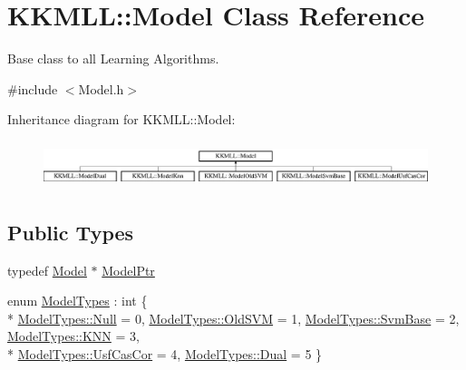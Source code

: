 \hypertarget{class_k_k_m_l_l_1_1_model}{}\section{K\+K\+M\+LL\+:\+:Model Class Reference}
\label{class_k_k_m_l_l_1_1_model}


Base class to all Learning Algorithms.  




{\ttfamily \#include $<$Model.\+h$>$}

Inheritance diagram for K\+K\+M\+LL\+:\+:Model\+:\begin{figure}[H]
\begin{center}
\leavevmode
\includegraphics[height=1.374233cm]{class_k_k_m_l_l_1_1_model}
\end{center}
\end{figure}
\subsection*{Public Types}
\begin{DoxyCompactItemize}
\item 
typedef \hyperlink{class_k_k_m_l_l_1_1_model}{Model} $\ast$ \hyperlink{class_k_k_m_l_l_1_1_model_a9560fa355dc53fa82541f55582a6d6ea}{Model\+Ptr}
\item 
enum \hyperlink{class_k_k_m_l_l_1_1_model_aeda4060e088c67446ca993eefcecea06}{Model\+Types} \+: int \{ \\*
\hyperlink{class_k_k_m_l_l_1_1_model_aeda4060e088c67446ca993eefcecea06abbb93ef26e3c101ff11cdd21cab08a94}{Model\+Types\+::\+Null} = 0, 
\hyperlink{class_k_k_m_l_l_1_1_model_aeda4060e088c67446ca993eefcecea06a7a3ee72cc2709227d58fd2c189a2a58b}{Model\+Types\+::\+Old\+S\+VM} = 1, 
\hyperlink{class_k_k_m_l_l_1_1_model_aeda4060e088c67446ca993eefcecea06ac59ef2743d310cad5d7bbb7b53773bb4}{Model\+Types\+::\+Svm\+Base} = 2, 
\hyperlink{class_k_k_m_l_l_1_1_model_aeda4060e088c67446ca993eefcecea06ab602e23c0ec2466f3aa6cade0cd5ce05}{Model\+Types\+::\+K\+NN} = 3, 
\\*
\hyperlink{class_k_k_m_l_l_1_1_model_aeda4060e088c67446ca993eefcecea06ade699dc1790347a08d7060ab8078c71c}{Model\+Types\+::\+Usf\+Cas\+Cor} = 4, 
\hyperlink{class_k_k_m_l_l_1_1_model_aeda4060e088c67446ca993eefcecea06acf53591af1208ddd535806600273099a}{Model\+Types\+::\+Dual} = 5
 \}
\end{DoxyCompactItemize}
